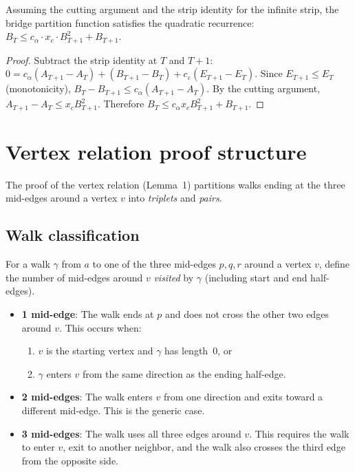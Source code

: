 \begin{theorem}\label{thm:bridge_recurrence_from_cutting}
\leanok
{}
  Assuming the cutting argument and the strip identity for the infinite strip,
  the bridge partition function satisfies the quadratic recurrence:
  $B_T \leq c_\alpha \cdot x_c \cdot B_{T+1}^2 + B_{T+1}$.
\end{theorem}
\begin{proof}
\leanok
{}
  Subtract the strip identity at $T$ and $T{+}1$:
  $0 = c_\alpha (A_{T+1} - A_T) + (B_{T+1} - B_T) + c_\varepsilon (E_{T+1} - E_T)$.
  Since $E_{T+1} \leq E_T$ (monotonicity), $B_T - B_{T+1} \leq c_\alpha (A_{T+1} - A_T)$.
  By the cutting argument, $A_{T+1} - A_T \leq x_c B_{T+1}^2$.
  Therefore $B_T \leq c_\alpha x_c B_{T+1}^2 + B_{T+1}$.
\end{proof}

\section{Vertex relation proof structure}\label{sec:vertex_rel_proof}

The proof of the vertex relation (Lemma~1) partitions walks ending at the
three mid-edges around a vertex $v$ into \emph{triplets} and \emph{pairs}.

\subsection{Walk classification}

For a walk $\gamma$ from $a$ to one of the three mid-edges $p, q, r$ around
a vertex $v$, define the number of mid-edges around $v$ \emph{visited} by
$\gamma$ (including start and end half-edges).

\begin{itemize}
\item \textbf{1 mid-edge}: The walk ends at $p$ and does not cross the other
  two edges around $v$. This occurs when:
  \begin{enumerate}
  \item[(a)] $v$ is the starting vertex and $\gamma$ has length~0, or
  \item[(b)] $\gamma$ enters $v$ from the same direction as the ending half-edge.
  \end{enumerate}

\item \textbf{2 mid-edges}: The walk enters $v$ from one direction and exits
  toward a different mid-edge. This is the generic case.

\item \textbf{3 mid-edges}: The walk uses all three edges around $v$. This
  requires the walk to enter $v$, exit to another neighbor, and the walk also
  crosses the third edge from the opposite side.
\end{itemize}

